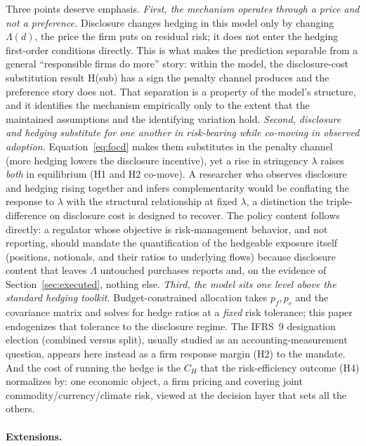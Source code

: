\documentclass[11pt,a4paper]{article}
\begin{document}
Three points deserve emphasis. \emph{First, the mechanism operates through a price and not a preference.} Disclosure changes hedging in this model only by changing $\Lambda(d)$, the price the firm puts on residual risk; it does not enter the hedging first-order conditions directly. This is what makes the prediction separable from a general ``responsible firms do more'' story: within the model, the disclosure-cost substitution result H(sub) has a sign the penalty channel produces and the preference story does not. That separation is a property of the model's structure, and it identifies the mechanism empirically only to the extent that the maintained assumptions and the identifying variation hold. \emph{Second, disclosure and hedging substitute for one another in risk-bearing while co-moving in observed adoption.} Equation~\eqref{eq:focd} makes them substitutes in the penalty channel (more hedging lowers the disclosure incentive), yet a rise in stringency $\lambda$ raises \emph{both} in equilibrium (H1 and H2 co-move). A researcher who observes disclosure and hedging rising together and infers complementarity would be conflating the response to $\lambda$ with the structural relationship at fixed $\lambda$, a distinction the triple-difference on disclosure cost is designed to recover. The policy content follows directly: a regulator whose objective is risk-management behavior, and not reporting, should mandate the quantification of the hedgeable exposure itself (positions, notionals, and their ratios to underlying flows) because disclosure content that leaves $\Lambda$ untouched purchases reports and, on the evidence of Section~\ref{sec:executed}, nothing else. \emph{Third, the model sits one level above the standard hedging toolkit.} Budget-constrained allocation takes $p_f,p_c$ and the covariance matrix and solves for hedge ratios at a \emph{fixed} risk tolerance; this paper endogenizes that tolerance to the disclosure regime. The IFRS~9 designation election (combined versus split), usually studied as an accounting-measurement question, appears here instead as a firm response margin (H2) to the mandate. And the cost of running the hedge is the $C_H$ that the risk-efficiency outcome (H4) normalizes by: one economic object, a firm pricing and covering joint commodity/currency/climate risk, viewed at the decision layer that sets all the others.

\paragraph{Extensions.}
\end{document}
